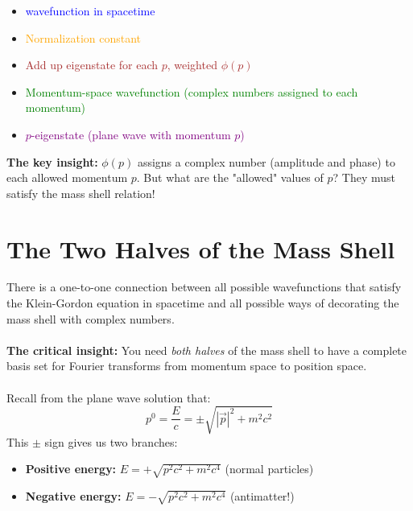 \documentclass{report}
\begin{document}
\begin{itemize}
	\item \textcolor{blue}{wavefunction in spacetime}
	\item \textcolor{orange}{Normalization constant}
	\item \textcolor{brown}{Add up eigenstate for each $p$, weighted $\phi(p)$}
	\item \textcolor{green}{Momentum-space wavefunction (complex numbers assigned to each momentum)}
	\item \textcolor{purple}{$p$-eigenstate (plane wave with momentum $p$)}
\end{itemize}
\vspace{1em}
\textbf{The key insight:} $\phi(p)$ assigns a complex number (amplitude and phase) to each allowed momentum $p$. But what are the "allowed" values of $p$? They must satisfy the mass shell relation!

\section{The Two Halves of the Mass Shell}
There is a one-to-one connection between all possible wavefunctions that satisfy the Klein-Gordon equation in spacetime and all possible ways of decorating the mass shell with complex numbers.\\
\\
\textbf{The critical insight:} You need \textit{both halves} of the mass shell to have a complete basis set for Fourier transforms from momentum space to position space.\\
\\
Recall from the plane wave solution that:
\begin{equation}
	p^{0} = \frac{E}{c} = \pm \sqrt{\left|\vec{p}\right|^2 + m^2c^2}
\end{equation}
This $\pm$ sign gives us two branches:
\begin{itemize}
	\item \textbf{Positive energy:} $E = +\sqrt{p^2c^2 + m^2c^4}$ (normal particles)
	\item \textbf{Negative energy:} $E = -\sqrt{p^2c^2 + m^2c^4}$ (antimatter!)
\end{itemize}
\end{document}

